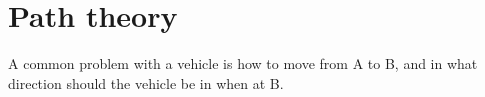\chapter{Path theory}
A common problem with a vehicle is how to move from A to B, and in what direction should the vehicle be in when at B. 